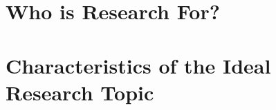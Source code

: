\section{Who is Research For?}
\frame{\sectionpage}


\section{Characteristics of the Ideal Research Topic}
\frame{\sectionpage}

